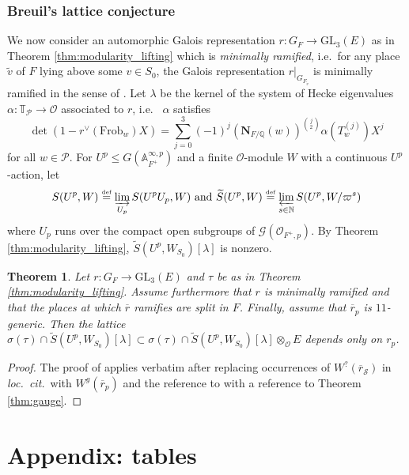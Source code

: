 \documentclass[oneside,a4paper,english, 11pt]{amsart}
\theoremstyle{plain}
\newtheorem{thm}{Theorem}[subsection]
\theoremstyle{plain}
\theoremstyle{plain}
\theoremstyle{plain}
\theoremstyle{plain}
\theoremstyle{plain}
\theoremstyle{definition}
\theoremstyle{definition}
\theoremstyle{definition}
\theoremstyle{remark}
\numberwithin{equation}{section}
\newcommand{\Q}{\mathbb{Q}}
\newcommand{\N}{\mathbb{N}}
\newcommand{\bT}{\mathbb{T}}
\newcommand{\cG}{\mathcal{G}}
\newcommand{\cO}{\mathcal{O}}
\newcommand{\cP}{\mathcal{P}}
\newcommand{\cS}{\mathcal{S}}
\newcommand{\GL}{\mathrm{GL}}
\newcommand{\tld}[1]{\widetilde{#1}}
\newcommand{\rbar}{\overline{r}}
\newcommand{\defeq}{\stackrel{\textrm{\tiny{def}}}{=}}
\newcommand{\ra}{\rightarrow}
\begin{document}
\subsubsection{Breuil's lattice conjecture} 
We now consider an automorphic Galois representation $r:G_F \ra \GL_3(E)$ as in Theorem \ref{thm:modularity_lifting} which is \emph{minimally ramified}, i.e.~for any place $\tld{v}$ of $F$ lying above some $v \in S_0$, the Galois representation $r|_{G_{F_{\tld{v}}}}$ is minimally ramified in the sense of \cite[Definition 2.4.14]{CHT}. 
Let $\lambda$ be the kernel of the system of Hecke eigenvalues $\alpha:\bT_{\cP}\rightarrow \cO$ associated to $r$, i.e.~ $\alpha$ satisfies 
\[
\det\left(1-r^{\vee}(\mathrm{Frob}_w)X\right)=\sum_{j=0}^3 (-1)^j(\mathbf{N}_{F/\Q}(w))^{\binom{j}{2}}\alpha(T_w^{(j)})X^j
\]
for all $w\in\cP$. 
For $U^p\leq G(\mathbb{A}_{F^+}^{\infty,p})$ and a finite $\cO$-module $W$ with a continuous $U^p$-action, let 
\[S(U^p, W) \defeq \varinjlim_{U_{p}} S(U^pU_{p}, W) \textrm{ and } \tld{S}(U^p, W) \defeq \varprojlim_{s\in\N} S(U^p,W/\varpi^s)\]
where $U_{p}$ runs over the compact open subgroups of $\cG(\cO_{F^+,p})$. 
By Theorem \ref{thm:modularity_lifting}, $\tld{S}(U^p, W_{S_0})[\lambda]$ is nonzero. 
%
%

\begin{thm}\label{thm:lattice}
Let $r:G_F \ra \GL_3(E)$ and $\tau$ be as in Theorem \ref{thm:modularity_lifting}. 
Assume furthermore that $r$ is minimally ramified and that the places at which $\rbar$ ramifies are split in $F$. 
Finally, assume that $\rbar_p$ is $11$-generic.
Then the lattice $\sigma(\tau) \cap \tld{S}(U^p, W_{S_0})[\lambda] \subset \sigma(\tau) \cap \tld{S}(U^p,W_{S_0})[\lambda]\otimes_{\cO} E $ depends only on $r_p$.
\end{thm}
\begin{proof}
The proof of \cite[Theorem 5.3.5]{LLLM2} applies verbatim after replacing occurrences of $W^?(\rbar_{\cS})$ in \emph{loc.~cit.}~with $W^g(\rbar_p)$ and the reference to \cite[Theorem 5.2.3]{LLLM2} with a reference to Theorem \ref{thm:gauge}.
\end{proof}




%
\section{Appendix: tables}
\label{sec:Appendix}
\end{document}
